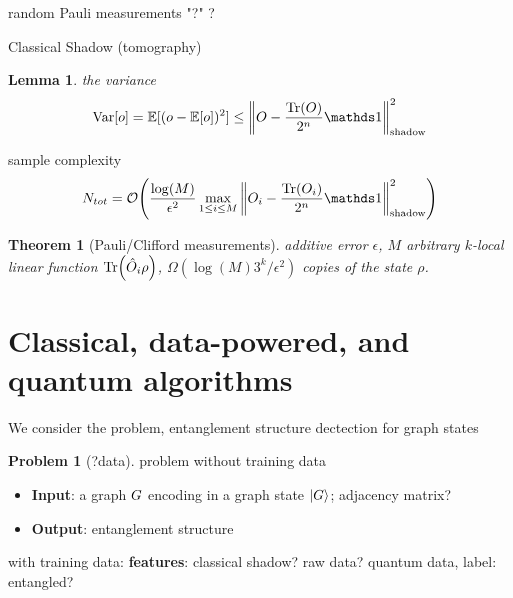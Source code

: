 \documentclass[
10pt,
aps,
pra,
linenumbers,
floatfix,
]{revtex4-2}
\theoremstyle{plain}
\newtheorem{theorem}{Theorem}
\newtheorem{lemma}{Lemma}
\theoremstyle{definition}
\newtheorem{problem}{Problem}
\newcommand{\shadow}{\text{shadow}}
\newcommand{\ob}{\hat{O}}
\newcommand{\dm}{\rho}
\begin{document}
\begin{algorithm}[H]
    \DontPrintSemicolon
    \Input{a density matrix $\dm$, ..}
    \BlankLine
     {
        random Pauli measurements 
    {\Return "?"}
    }
    \Return ?
    \caption{Classical Shadow (tomography)}
    \label{alg:classical_shadow}
\end{algorithm}
\begin{lemma}
	the variance
	\begin{equation}
		\variance[o] = \expectation[(o-\expectation[o])^2]
		\le \norm{O - \frac{\Tr(O)}{2^n} \identity}^2_{\shadow}
	\end{equation}
\end{lemma}
sample complexity
\begin{equation}
	N_{tot} = \bigO \qty(
		\frac{\log (M)}{\epsilon^2} \max_{1\le i\le M} 
		\norm{O_i - \frac{\Tr(O_i)}{2^n} \identity}^2_{\shadow}
	)
\end{equation}
\begin{theorem}[Pauli/Clifford measurements]\label{thm:classical_shadow}
	additive error $\epsilon$, $M$ arbitrary $k$-local linear function $\Tr(\ob_i\dm)$,
	$\Omega(\log(M) 3^k/\epsilon^2)$ copies of the state $\dm$.
\end{theorem}

\section{Classical, data-powered, and quantum algorithms}
We consider the problem, entanglement structure dectection for graph states 
\begin{problem}[?data]
	problem without training data
	\begin{itemize}
		\item \textbf{Input}: a graph $G$ encoding in a graph state $\ket{G}$;
		adjacency matrix?
		\item \textbf{Output}: entanglement structure
	\end{itemize}
\end{problem}
with training data: 
\textbf{features}: classical shadow? raw data? quantum data, label: entangled?
\end{document}
